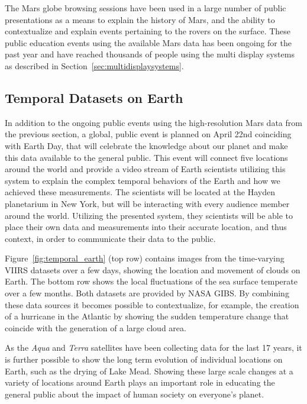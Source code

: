 \documentclass[journal]{vgtc}                %
\newcommand{\fig}[1]{Figure~\ref{fig:#1}}
\begin{document}
The Mars globe browsing sessions have been used in a large number of public presentations as a means to explain the history of Mars, and the ability to contextualize and explain events pertaining to the rovers on the surface.
These public education events using the available Mars data has been ongoing for the past year and have reached thousands of people using the multi display systems as described in Section~\ref{sec:multidisplaysystems}.

\subsection{Temporal Datasets on Earth}
In addition to the ongoing public events using the high-resolution Mars data from the previous section, a global, public event is planned on April 22nd coinciding with Earth Day, that will celebrate the knowledge about our planet and make this data available to the general public.
This event will connect five locations around the world and provide a video stream of Earth scientists utilizing this system to explain the complex temporal behaviors of the Earth and how we achieved these measurements.
The scientists will be located at the Hayden planetarium in New York, but will be interacting with every audience member around the world.
Utilizing the presented system, they scientists will be able to place their own data and measurements into their accurate location, and thus context, in order to communicate their data to the public.

\fig{temporal_earth} (top row) contains images from the time-varying VIIRS datasets over a few days, showing the location and movement of clouds on Earth. The bottom row shows the local fluctuations of the sea surface temperate over a few months. Both datasets are provided by NASA GIBS.
By combining these data sources it becomes possible to contextualize, for example, the creation of a hurricane in the Atlantic by showing the sudden temperature change that coincide with the generation of a large cloud area.

As the \emph{Aqua} and \emph{Terra} satellites have been collecting data for the last 17 years, it is further possible to show the long term evolution of individual locations on Earth, such as the drying of Lake Mead.
Showing these large scale changes at a variety of locations around Earth plays an important role in educating the general public about the impact of human society on everyone's planet.
\end{document}
